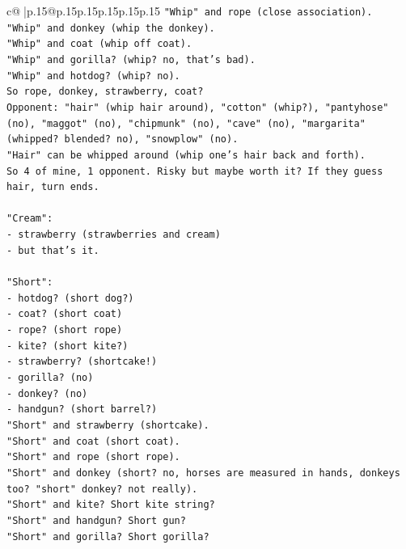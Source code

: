 \documentclass{article}
\begin{document}
{\begin{supertabular}{c@{$\;$}|p{.15\linewidth}@{}p{.15\linewidth}p{.15\linewidth}p{.15\linewidth}p{.15\linewidth}p{.15\linewidth}}
{{{\texttt{"Whip" and rope (close association).} \\
\texttt{"Whip" and donkey (whip the donkey).} \\
\texttt{"Whip" and coat (whip off coat).} \\
\texttt{"Whip" and gorilla? (whip? no, that's bad).} \\
\texttt{"Whip" and hotdog? (whip? no).} \\
\texttt{So rope, donkey, strawberry, coat?} \\
\texttt{Opponent: "hair" (whip hair around), "cotton" (whip?), "pantyhose" (no), "maggot" (no), "chipmunk" (no), "cave" (no), "margarita" (whipped? blended? no), "snowplow" (no).} \\
\texttt{"Hair" can be whipped around (whip one's hair back and forth).} \\
\texttt{So 4 of mine, 1 opponent. Risky but maybe worth it? If they guess hair, turn ends.} \\
\\ 
\texttt{"Cream":} \\
\texttt{{-} strawberry (strawberries and cream)} \\
\texttt{{-} but that's it.} \\
\\ 
\texttt{"Short":} \\
\texttt{{-} hotdog? (short dog?)} \\
\texttt{{-} coat? (short coat)} \\
\texttt{{-} rope? (short rope)} \\
\texttt{{-} kite? (short kite?)} \\
\texttt{{-} strawberry? (shortcake!)} \\
\texttt{{-} gorilla? (no)} \\
\texttt{{-} donkey? (no)} \\
\texttt{{-} handgun? (short barrel?)} \\
\texttt{"Short" and strawberry (shortcake).} \\
\texttt{"Short" and coat (short coat).} \\
\texttt{"Short" and rope (short rope).} \\
\texttt{"Short" and donkey (short? no, horses are measured in hands, donkeys too? "short" donkey? not really).} \\
\texttt{"Short" and kite? Short kite string?} \\
\texttt{"Short" and handgun? Short gun?} \\
\texttt{"Short" and gorilla? Short gorilla?} \\
}}}
\end{supertabular}}
\end{document}
